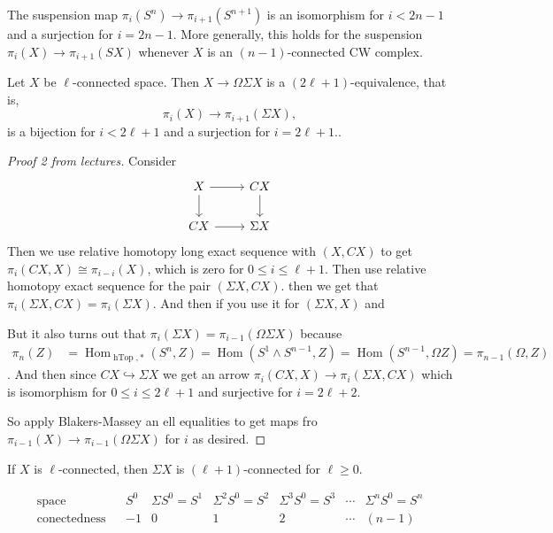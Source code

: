 \begin{coro}
	The suspension map $\pi_{i}(S^{n})\to \pi_{i+1}(S^{n+1})$ is an isomorphism for $i<2n-1$ and a surjection for $i=2n-1$. More generally, this holds for the suspension $\pi_{i}(X)\to \pi_{i+1}(SX)$ whenever $X$ is an $(n-1)$-connected CW complex.
\end{coro}
\begin{thm}
		Let $X$ be $\ell$-connected space. Then $X\to\Omega\Sigma X$ is a $(2\ell+1)$-equivalence, that is,
	\[\pi_i(X)\to \pi_{i+1}(\Sigma X),\]
	is a bijection for $i<2\ell+1$ and a surjection for $i=2\ell+1$..
\end{thm}
\begin{proof}[Proof 2 from lectures]
	Consider
	\[\begin{tikzcd}
		X\arrow[r]\arrow[d]&CX\arrow[d]\\
		CX\arrow[r]&\Sigma X
	\end{tikzcd}\]
	Then we use relative homotopy long exact sequence with $(X,CX)$ to get $\pi_i(CX,X)\cong\pi_{i-i}(X)$, which is zero for $0\leq i\leq \ell+1$. Then use relative homotopy exact sequence for the pair $(\Sigma X,CX)$. then we get that $\pi_i(\Sigma X,CX)=\pi_i(\Sigma X)$. And then if you use it for $(\Sigma X, X)$ and 
	
	But it also turns out that $\pi_i(\Sigma X)=\pi_{i-1}(\Omega\Sigma X)$ because
	\begin{align*}
		\pi_n(Z)&=\operatorname{Hom}_{\operatorname{hTop},*}(S^n,Z)=\operatorname{Hom}(S^1\wedge S^{n-1},Z)=\operatorname{Hom}(S^{n-1},\Omega Z)=\pi_{n-1}(\Omega,Z)
	\end{align*}.
	And then since $CX\hookrightarrow \Sigma X$ we get an arrow $\pi_i(CX,X)\to\pi_i(\Sigma X,CX)$ which is isomorphism for $0\leq i \leq 2\ell +1$ and surjective for $i=2\ell+2$.
	
	So apply Blakers-Massey an ell equalities to get maps fro $\pi_{i-1}(X)\to\pi_{i-1}(\Omega\Sigma X)$ for $i$ as desired.
\end{proof}
\begin{coro}
	If $X$ is $\ell$-connected, then $\Sigma X$ is $(\ell+1)$-connected for $\ell\geq0$.
\end{coro}
\[\begin{matrix}
	\text{space}&&S^0&\Sigma S^0=S^1&\Sigma^2S^0=S^2&\Sigma^3S^0=S^3&\cdots&\Sigma^nS^0=S^n\\
	\text{conectedness}&&-1&0&1&2&\cdots&(n-1)
\end{matrix}\]

